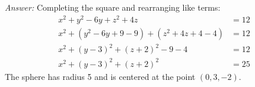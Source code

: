 \ifnum {} {\color{DarkBlue} \textit{Answer:} Completing the square and rearranging like terms: 
\begin{align}
    x^2 + y^2 - 6y + z^2 + 4z &= 12 \\
    x^2 + (y^2 - 6y +9 - 9) + (z^2 + 4z + 4 - 4 )&= 12 \\
    x^2 + (y -3)^2 + (z + 2)^2 - 9 - 4 &= 12 \\
    x^2 + (y -3)^2 + (z + 2)^2 &= 25 
\end{align}
The sphere has radius 5 and is centered at the point $(0,3,-2)$. 

} 
\else
  
\fi
\fi